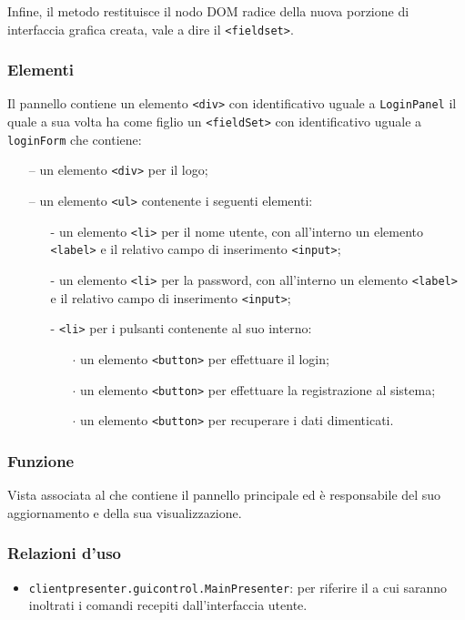 \begin{description}
Infine, il metodo restituisce il nodo DOM radice della nuova porzione di interfaccia grafica creata, vale a dire il \verb'<fieldset>'.

\end{description}

\subsubsection*{Elementi}
Il pannello contiene un elemento \verb'<div>' con identificativo uguale a \verb'LoginPanel' il quale a sua volta ha come figlio un \verb'<fieldSet>' con identificativo uguale a \verb'loginForm' che contiene:
  \begin{itemize}
    \item[--] un elemento \verb'<div>' per il logo;
    \item[--] un elemento \verb'<ul>' contenente i seguenti elementi:
    \begin{itemize}
      \item[-] un elemento \verb'<li>' per il nome utente, con all'interno un elemento \verb'<label>' e il relativo campo di inserimento \verb'<input>';
      \item[-] un elemento \verb'<li>' per la password, con all'interno un elemento \verb'<label>' e il relativo campo di inserimento \verb'<input>';
      \item[-] \verb'<li>' per i pulsanti contenente al suo interno:
      \begin{itemize}
        \item[$\cdot$] un elemento \verb'<button>' per effettuare il login;
        \item[$\cdot$] un elemento \verb'<button>' per effettuare la registrazione al sistema;
        \item[$\cdot$] un elemento \verb'<button>' per recuperare i dati dimenticati.
      \end{itemize}
    \end{itemize}
  \end{itemize}
  

\subsubsection*{Funzione}
Vista associata al  che contiene il pannello principale ed è responsabile del suo aggiornamento e della sua visualizzazione.

\subsubsection*{Relazioni d'uso}
\begin{itemize}
  \item \texttt{clientpresenter.guicontrol.MainPresenter}: per riferire il  a cui saranno inoltrati i comandi recepiti dall'interfaccia utente.
\end{itemize}

